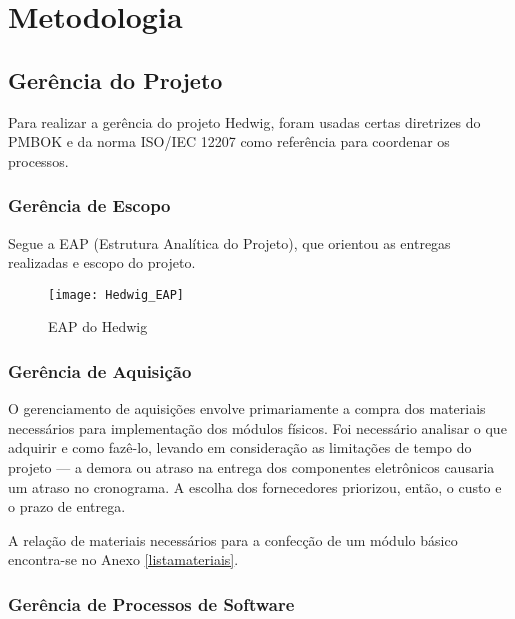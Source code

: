 \chapter{Metodologia}

\section{Gerência do Projeto}

Para realizar a gerência do projeto Hedwig, foram usadas certas diretrizes do PMBOK \cite{pmi} e da norma ISO/IEC 12207 \cite{iso12207} como referência para coordenar os processos.

\subsection{Gerência de Escopo}

Segue a EAP (Estrutura Analítica do Projeto), que orientou as entregas realizadas e escopo do projeto.

\begin{figure}[H]
	\centering
	\caption{EAP do Hedwig}
	\texttt{[image: Hedwig\_EAP]}
	\label{fig:Hedwig_EAP}
\end{figure}

\subsection{Gerência de Aquisição}

O gerenciamento de aquisições envolve primariamente a compra dos materiais necessários para implementação dos módulos físicos. Foi necessário analisar o que adquirir e como fazê-lo, levando em consideração as limitações de tempo do projeto --- a demora ou atraso na entrega dos componentes eletrônicos causaria um atraso no cronograma. A escolha dos fornecedores priorizou, então, o custo e o prazo de entrega.

A relação de materiais necessários para a confecção de um módulo básico encontra-se no Anexo \ref{listamateriais}.

\subsection{Gerência de Processos de Software}

